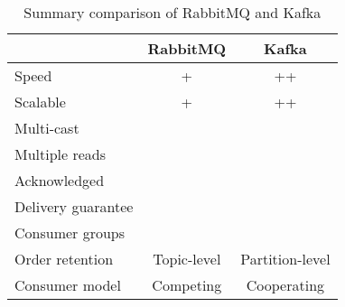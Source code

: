 \begin{table}
\centering
\begin{tabular}{|l||c|c|}\hline
  					& RabbitMQ 			& Kafka 		\\ \hline 
Speed				& + 				& ++ 			\\ \hline
Scalable			& +					& ++	 		\\ \hline
Multi-cast			&\xmark				& \cmark		\\ \hline
Multiple reads		&\xmark				& \cmark		\\ \hline
Acknowledged		&\cmark				& \xmark		\\ \hline
Delivery guarantee	&\cmark				& \xmark		\\ \hline
Consumer groups		&\cmark				&\cmark			\\ \hline
Order retention		&Topic-level		& Partition-level\\ \hline
Consumer model	 	&Competing			& Cooperating	\\ \hline
\end{tabular}
\caption{Summary comparison of RabbitMQ and Kafka}
\label{table:rabbitmq-kafka}
\end{table}

 
